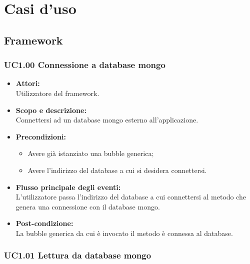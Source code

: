 \section{Casi d'uso}

\subsection{Framework}

\subsubsection{UC1.00 Connessione a database mongo} \label{UC1.00}

\begin{itemize}
\item \textbf{Attori:}
\\Utilizzatore del framework.
\item \textbf{Scopo e descrizione:} 
\\Connettersi ad un database mongo esterno all’applicazione.
\item \textbf{Precondizioni:}
	\begin{itemize}
		\item Avere già istanziato una bubble generica;
		\item Avere l’indirizzo del database  a cui si desidera connettersi.
	\end{itemize}
\item \textbf{Flusso principale degli eventi:}
\\L’utilizzatore passa l’indirizzo del database a cui connettersi al metodo che genera una connessione con il database mongo.
\item \textbf{Post-condizione:}
\\La bubble generica da cui è invocato il metodo è connessa al database.
\end{itemize}

\subsubsection{UC1.01 Lettura da database mongo} \label{UC1.01}

